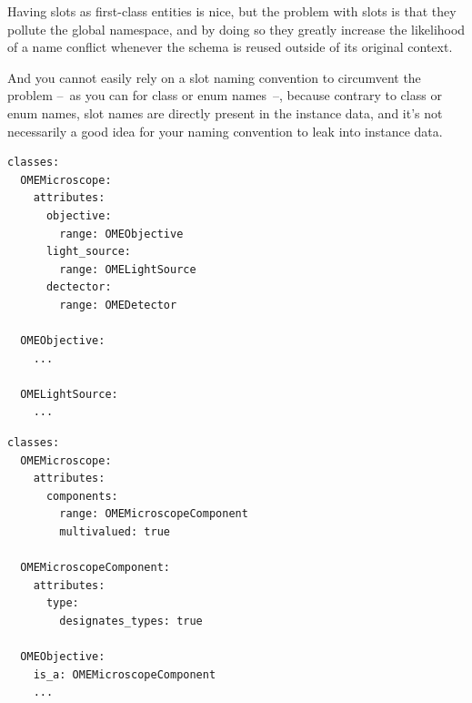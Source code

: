 \begin{frame}
{    Having slots as first-class entities is nice, but the problem with
    slots is that they pollute the global namespace, and by doing so
    they greatly increase the likelihood of a name conflict whenever the
    schema is reused outside of its original context.

    And you cannot easily rely on a slot naming convention to circumvent
    the problem --~as you can for class or enum names~--, because
    contrary to class or enum names, slot names are directly present in
    the instance data, and it's not necessarily a good idea for your
    naming convention to leak into instance data.\par
  }
\end{frame}

\begin{lrbox}{\examplea}
\begin{lstlisting}[basicstyle=\scriptsize]
classes:
  OMEMicroscope:
    attributes:
      objective:
        range: OMEObjective
      light_source:
        range: OMELightSource
      dectector:
        range: OMEDetector

  OMEObjective:
    ...

  OMELightSource:
    ...
\end{lstlisting}
\end{lrbox}

\begin{lrbox}{\exampleb}
\begin{lstlisting}[basicstyle=\scriptsize]
classes:
  OMEMicroscope:
    attributes:
      components:
        range: OMEMicroscopeComponent
        multivalued: true

  OMEMicroscopeComponent:
    attributes:
      type:
        designates_types: true

  OMEObjective:
    is_a: OMEMicroscopeComponent
    ...
\end{lstlisting}
\end{lrbox}

